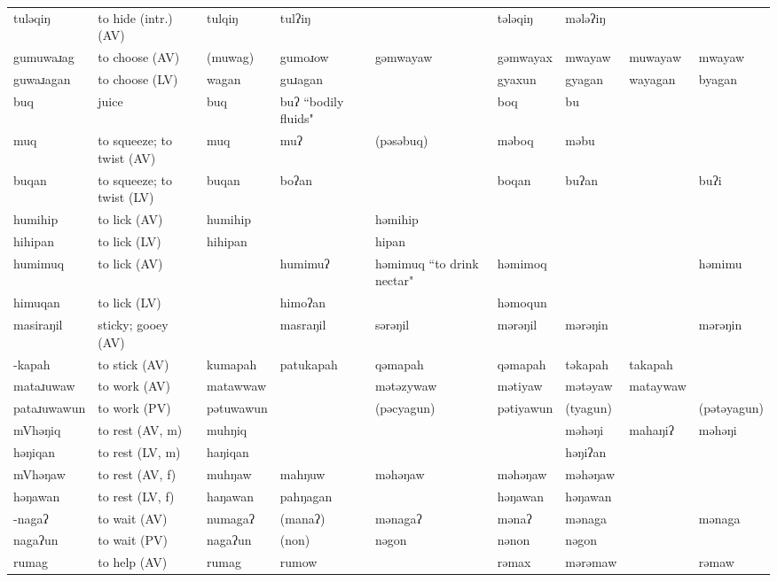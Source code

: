 \begin{landscape}
\begin{longtable}{*{9}{>{\raggedright\arraybackslash}p{}}}
\text{*}tuləqiŋ & to hide (intr.) (AV) & tulqiŋ & tulʔiŋ &  & tələqiŋ & mələʔiŋ &  & \\
\text{*}gumuwaɹag & to choose (AV) & (muwag) & gumoɹow & gəmwayaw & gəmwayax & mwayaw & muwayaw & mwayaw\\
\text{*}guwaɹagan & to choose (LV) & wagan & guɹagan &  & gyaxun & gyagan & wayagan & byagan\\
\text{*}buq & juice & buq & buʔ \newline ``bodily fluids" &  & boq & bu &  & \\
\text{*}muq & to squeeze; to twist (AV) & muq & muʔ & (pəsəbuq) & məboq & məbu &  & \\
\text{*}buqan & to squeeze; to twist (LV) & buqan & boʔan &  & boqan & buʔan &  & buʔi\\
\text{*}humihip & to lick (AV) & humihip &  & həmihip &  &  &  & \\
\text{*}hihipan & to lick (LV) & hihipan &  & hipan &  &  &  & \\
\text{*}humimuq & to lick (AV) &  & humimuʔ & həmimuq ``to drink nectar" & həmimoq &  &  & həmimu\\
\text{*}himuqan & to lick (LV) &  & himoʔan &  & həmoqun &  &  & \\
\text{*}masiraŋil & sticky; gooey (AV) &  & masraŋil & sərəŋil & mərəŋil & mərəŋin &  & mərəŋin\\
\text{*}-kapah & to stick (AV) & kumapah & patukapah & qəmapah & qəmapah & təkapah & takapah & \\
\text{*}mataɹuwaw & to work (AV) & matawwaw &  & mətəzywaw & mətiyaw & mətəyaw & mataywaw & \\
\text{*}pataɹuwawun & to work (PV) & pətuwawun &  & (pəcyagun) & pətiyawun & (tyagun) &  & (pətəyagun)\\
\text{*}mVhəŋiq & to rest (AV, m) & muhŋiq &  &  &  & məhəŋi & mahaŋiʔ & məhəŋi\\
\text{*}həŋiqan & to rest (LV, m) & haŋiqan &  &  &  & həŋiʔan &  & \\
\text{*}mVhəŋaw & to rest (AV, f) & muhŋaw & mahŋuw & məhəŋaw & məhəŋaw & məhəŋaw &  & \\
\text{*}həŋawan & to rest (LV, f) & haŋawan & pahŋagan &  & həŋawan & həŋawan &  & \\
\text{*}-nagaʔ & to wait (AV) & numagaʔ & (manaʔ) & mənagaʔ & mənaʔ & mənaga &  & mənaga\\
\text{*}nagaʔun & to wait (PV) & nagaʔun & (non) & nəgon & nənon & nəgon &  & \\
\text{*}rumag & to help (AV) & rumag & rumow &  & rəmax & mərəmaw &  & rəmaw\\

\end{longtable}
\end{landscape}
